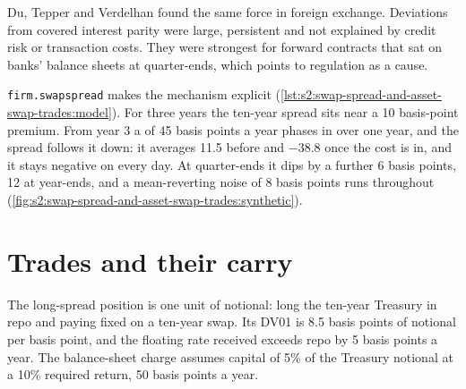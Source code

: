 Du, Tepper and Verdelhan found the same force in foreign exchange. Deviations from covered interest parity were large, persistent and not explained by
credit risk or transaction costs. They were strongest for forward contracts that sat on banks' balance sheets at quarter-ends, which points to
regulation as a cause.

\texttt{firm.swapspread} makes the mechanism explicit (\cref{lst:s2:swap-spread-and-asset-swap-trades:model}). For three years the ten-year spread
sits near a 10 basis-point premium. From year 3 a  of 45 basis points a year phases in over one year, and the spread follows it
down: it averages 11.5 before and $-38.8$ once the cost is in, and it stays negative on every day. At quarter-ends it dips by a further 6 basis points,
12 at year-ends, and a mean-reverting noise of 8 basis points runs throughout (\cref{fig:s2:swap-spread-and-asset-swap-trades:synthetic}).

\begin{omfigure}

\label{fig:s2:swap-spread-and-asset-swap-trades:synthetic}
\end{omfigure}

\section{Trades and their carry}

The long-spread position is one unit of notional: long the ten-year Treasury in repo and paying fixed on a ten-year swap. Its DV01 is 8.5 basis points
of notional per basis point, and the floating rate received exceeds repo by 5 basis points a year. The balance-sheet charge assumes capital of 5\% of
the Treasury notional at a 10\% required return, 50 basis points a year.

